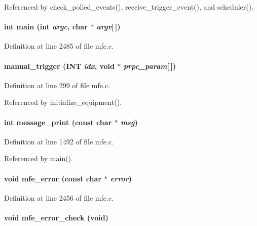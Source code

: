 Referenced by check\_\-polled\_\-events(), receive\_\-trigger\_\-event(), and scheduler().
\paragraph[{main}]{\setlength{\rightskip}{0pt plus 5cm}int main (int {\em argc}, \/  char $\ast$ {\em argv}\mbox{[}$\,$\mbox{]})}\hfill\label{mfe_8c_a0ddf1224851353fc92bfbff6f499fa97}


Definition at line 2485 of file mfe.c.
\paragraph[{manual\_\-trigger}]{ manual\_\-trigger ({\bf INT} {\em idx}, \/  void $\ast$ {\em prpc\_\-param}\mbox{[}$\,$\mbox{]})}\hfill\label{mfe_8c_aa5db6f0a873100f5d99f5f3518be2425}


Definition at line 299 of file mfe.c.

Referenced by initialize\_\-equipment().
\paragraph[{message\_\-print}]{\setlength{\rightskip}{0pt plus 5cm}int message\_\-print (const char $\ast$ {\em msg})}\hfill\label{mfe_8c_a4186dc25477a1b947c5d6ef64bcc4da0}


Definition at line 1492 of file mfe.c.

Referenced by main().
\paragraph[{mfe\_\-error}]{\setlength{\rightskip}{0pt plus 5cm}void mfe\_\-error (const char $\ast$ {\em error})}\hfill\label{mfe_8c_a96aae5fbd4be3618b2fe6f1030d73ab5}


Definition at line 2456 of file mfe.c.
\paragraph[{mfe\_\-error\_\-check}]{\setlength{\rightskip}{0pt plus 5cm}void mfe\_\-error\_\-check (void)}\hfill\label{mfe_8c_acbf3a0cf2e2a061816bd2d95dd097a20}


